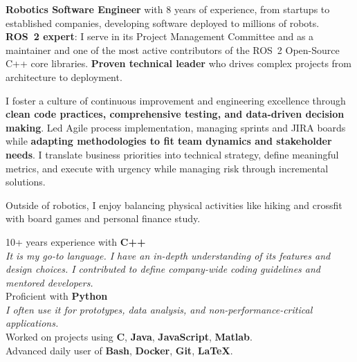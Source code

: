 \documentclass[letterpaper]{soragna-onepage-twocols} %
\begin{document}
\begin{minipage}[t]{\leftsectionwidth}



\textbf{Robotics Software Engineer} with 8 years of experience, from startups to established companies, developing software deployed to millions of robots.
\textbf{ROS~2 expert}: I serve in its Project Management Committee and as a maintainer and one of the most active contributors of the ROS~2 Open-Source C++ core libraries.
\textbf{Proven technical leader} who drives complex projects from architecture to deployment.

I foster a culture of continuous improvement and engineering excellence through \textbf{clean code practices, comprehensive testing, and data-driven decision making}.
Led Agile process implementation, managing sprints and JIRA boards while  \textbf{adapting methodologies to fit team dynamics and stakeholder needs}.
I translate business priorities into technical strategy, define meaningful metrics, and execute with urgency while managing risk through incremental solutions.

Outside of robotics, I enjoy balancing physical activities like hiking and crossfit with board games and personal finance study.

\sectionspace %



10+ years experience with \textbf{C++}\\
{\emph{It is my go-to language.
I have an in-depth understanding of its features and design choices.
I contributed to define company-wide coding guidelines and mentored developers.}}\\
Proficient with \textbf{Python}\\
{\emph{I often use it for prototypes, data analysis, and non-performance-critical applications.}}\\
Worked on projects using \textbf{C}, \textbf{Java}, \textbf{JavaScript}, \textbf{Matlab}.\\
Advanced daily user of \textbf{Bash}, \textbf{Docker}, \textbf{Git}, \textbf{LaTeX}.\\


\end{minipage}
\end{document}
